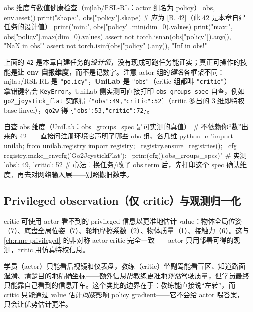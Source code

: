 \begin{codebox}[Python]{obs 维度与数值健康检查（mjlab/RSL-RL：actor 组名为 policy）}
obs, _ = env.reset()
print("shape:", obs["policy"].shape)               # 应为 [B, 42]（此 42 是本章自建任务的设计值）
print("min:", obs["policy"].min(dim=0).values)
print("max:", obs["policy"].max(dim=0).values)
assert not torch.isnan(obs["policy"]).any(), "NaN in obs!"
assert not torch.isinf(obs["policy"]).any(), "Inf in obs!"
\end{codebox}

\begin{note}[别背“42 维”——让框架\emph{告诉}你维度（组名 mjlab=\texttt{policy} vs UniLab=\texttt{obs}）]
上面的 \verb|42| 是本章自建任务的\emph{设计值}，没有现成可跑任务能证实；真正可操作的技能是\textbf{让 env 自报维度}，而不是记数字。注意 actor 组的\emph{键名}各框架不同：mjlab/RSL-RL 是 \verb|"policy"|，\textbf{UniLab 是} \verb|"obs"|（critic 组都叫 \verb|"critic"|）——拿错键名会 \verb|KeyError|。UniLab 侧实测可直接打印 \verb|obs_groups_spec| 自查，例如 \verb|go2_joystick_flat| 实跑得 \verb|{"obs":49,"critic":52}|（critic 多出的 3 维即特权 base linvel），\verb|go2w| 得 \verb|{"obs":53,"critic":72}|。

\begin{codebox}[bash]{自查 obs 维度（UniLab：obs\_groups\_spec 是可实测的真值）}
# 不依赖你“数”出来的 42——直接问注册环境它声明了哪些 obs 组、各几维
python -c "import unilab; from unilab.registry import registry; \
registry.ensure_registries(); \
cfg = registry.make_envcfg('Go2JoystickFlat'); \
print(cfg().obs_groups_spec)"        # 实测 {'obs': 49, 'critic': 52}
# 心法：换任务/改了 obs term 后，先打印这个 spec 确认维度，再去对网络输入层——别照搬旧数字。
\end{codebox}
\end{note}

\subsection{Privileged observation（仅 critic）与观测归一化}
\label{sec:rlmc-wh-privileged}

critic 可使用 actor 看不到的 privileged 信息以更准地估计 value：物体全局位姿（7）、底盘全局位姿（7）、轮地摩擦系数（2）、物体质量（1）、接触力（6）。这与 \cref{ch:rlmc-privileged} 的非对称 actor-critic 完全一致——actor 只用部署可得的观测，critic 用仿真特权信息。

\begin{insight}\label{ins:rlmc-wh-asym}
学员（actor）只能看后视镜和仪表盘，教练（critic）坐副驾能看盲区、知道路面湿滑、清楚目的地精确坐标——额外信息帮教练更准地\emph{评估}驾驶质量，但学员最终只能靠自己看到的信息开车。这个类比的边界在于：教练能直接说“左转”，而 critic 只能通过 value 估计\emph{间接}影响 policy gradient——它不会给 actor 喂答案，只会让优势估计更准。
\end{insight}

